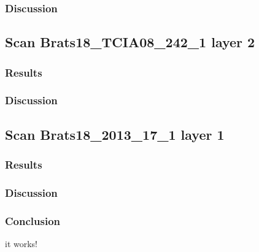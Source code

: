 \subsubsection{Discussion}

\subsection{Scan Brats18\_TCIA08\_242\_1 layer 2}

\subsubsection{Results}

\subsubsection{Discussion}

\subsection{Scan Brats18\_2013\_17\_1 layer 1}
\subsubsection{Results}

\subsubsection{Discussion}

\subsubsection{Conclusion}
it works!